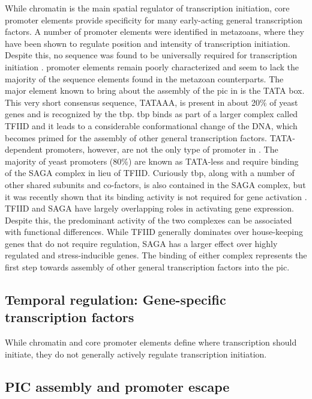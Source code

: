 While chromatin is the main spatial regulator of transcription initiation, core promoter elements provide specificity for many early-acting general transcription factors. 
A number of promoter elements were identified in metazoans, where they have been shown to regulate position and intensity of transcription initiation.
Despite this, no sequence was found to be universally required for transcription initiation \cite{butler:2002:RNA}.
\cer promoter elements remain poorly characterized and seem to lack the majority of the sequence elements found in the metazoan counterparts. 
The major element known to bring about the assembly of the \gls{pic} in \cer is the TATA box.
This very short consensus sequence, TATAAA, is present in about 20\% of yeast genes and is recognized by the \gls{tbp}. 
\gls{tbp} binds as part of a larger complex called TFIID and it leads to a considerable conformational change of the DNA, which becomes primed for the assembly of other general transcription factors. 
TATA-dependent promoters, however, are not the only type of promoter in \cer. 
The majority of yeast promoters (80\%)  are known as TATA-less and require binding of the SAGA complex in lieu of TFIID. 
Curiously \gls{tbp}, along with a number of other shared subunits and co-factors, is also contained in the SAGA complex, but it was recently shown that its binding activity is not required for gene activation .
TFIID and SAGA have largely overlapping roles in activating gene expression.
Despite this, the predominant activity of the two complexes can be associated with functional differences.
While TFIID generally dominates over house-keeping genes that do not require regulation, SAGA has a larger effect over highly regulated and stress-inducible genes.
The binding of either complex represents the first step towards assembly of other general transcription factors into the \gls{pic}.

\subsection{Temporal regulation: Gene-specific transcription factors}
While chromatin and core promoter elements define where transcription should initiate, they do not generally actively regulate transcription initiation. 



\subsection{PIC assembly and promoter escape}

